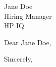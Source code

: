 \documentclass[12pt,letter]{letter}
\def\hm{Jane Doe} %
\def\company{HP IQ} %
\begin{document}
\begin{letter}{\hm \\ Hiring Manager \\ \company }

\opening{Dear \hm,}

\setlength\parindent{.5in}





\closing{Sincerely,}
\end{letter}
\end{document}
